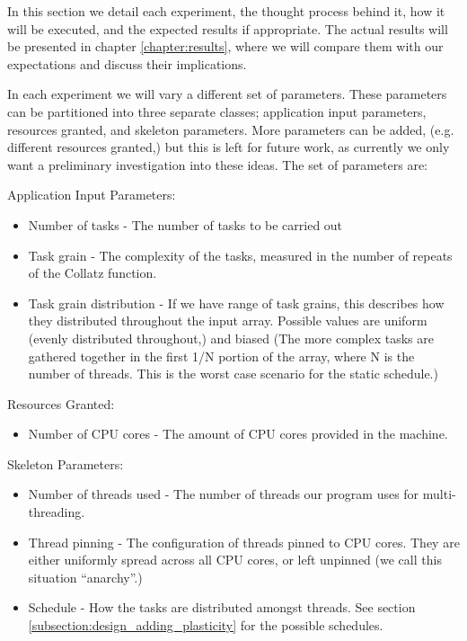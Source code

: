 In this section we detail each experiment, the thought process behind it, how it will be executed, and the expected results if appropriate. The actual results will be presented in chapter \ref{chapter:results}, where we will compare them with our expectations and discuss their implications.

In each experiment we will vary a different set of parameters. These parameters can be partitioned into three separate classes; application input parameters, resources granted, and skeleton parameters. More parameters can be added, (e.g. different resources granted,) but this is left for future work, as currently we only want a preliminary investigation into these ideas. The set of parameters are:

Application Input Parameters:

\begin{itemize}
	\item Number of tasks - The number of tasks to be carried out
	\item Task grain - The complexity of the tasks, measured in the number of repeats of the Collatz function.
	\item Task grain distribution - If we have range of task grains, this describes how they distributed throughout the input array. Possible values are uniform (evenly distributed throughout,) and biased (The more complex tasks are gathered together in the first 1/N portion of the array, where N is the number of threads. This is the worst case scenario for the static schedule.)
\end{itemize}

Resources Granted:

\begin{itemize}
	\item Number of CPU cores - The amount of CPU cores provided in the machine.
\end{itemize}

Skeleton Parameters:

\begin{itemize}
	\item Number of threads used - The number of threads our program uses for multi-threading.
	\item Thread pinning - The configuration of threads pinned to CPU cores. They are either uniformly spread across all CPU cores, or left unpinned (we call this situation ``anarchy''.)
	\item Schedule - How the tasks are distributed amongst threads. See section \ref{subsection:design_adding_plasticity} for the possible schedules.
\end{itemize}

